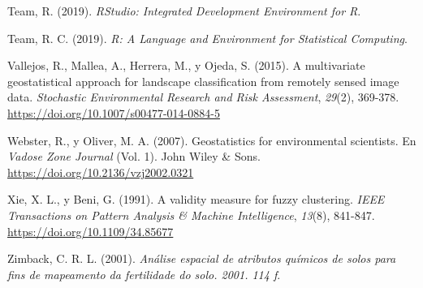 \documentclass[11pt,b5paper,]{krantz}
\begin{document}
\hypertarget{ref-RStudio_Team_2019}{}
Team, R. (2019). \emph{RStudio: Integrated Development Environment for
R}.

\hypertarget{ref-R_Core_Team_2019}{}
Team, R. C. (2019). \emph{R: A Language and Environment for Statistical
Computing}.

\hypertarget{ref-Vallejos2015}{}
Vallejos, R., Mallea, A., Herrera, M., y Ojeda, S. (2015). A
multivariate geostatistical approach for landscape classification from
remotely sensed image data. \emph{Stochastic Environmental Research and
Risk Assessment}, \emph{29}(2), 369-378.
\url{https://doi.org/10.1007/s00477-014-0884-5}

\hypertarget{ref-Webster_Oliver_2007}{}
Webster, R., y Oliver, M. A. (2007). Geostatistics for environmental
scientists. En \emph{Vadose Zone Journal} (Vol. 1). John Wiley \& Sons.
\url{https://doi.org/10.2136/vzj2002.0321}

\hypertarget{ref-Xie_Beni_1991}{}
Xie, X. L., y Beni, G. (1991). A validity measure for fuzzy clustering.
\emph{IEEE Transactions on Pattern Analysis \& Machine Intelligence},
\emph{13}(8), 841-847. \url{https://doi.org/10.1109/34.85677}

\hypertarget{ref-Zimback_2001}{}
Zimback, C. R. L. (2001). \emph{Análise espacial de atributos químicos
de solos para fins de mapeamento da fertilidade do solo. 2001. 114 f}.

\backmatter
\printindex
\end{document}
